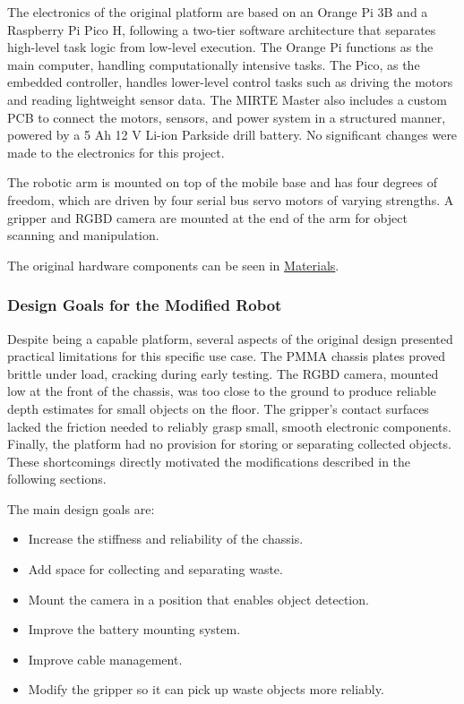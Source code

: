     The electronics of the original platform are based on an Orange Pi 3B and a Raspberry Pi Pico H, following a two-tier software architecture that separates high-level task logic from low-level execution. The Orange Pi functions as the main computer, handling computationally intensive tasks. The Pico, as the embedded controller, handles lower-level control tasks such as driving the motors and reading lightweight sensor data. The MIRTE Master also includes a custom PCB to connect the motors, sensors, and power system in a structured manner, powered by a 5 Ah 12 V Li-ion Parkside drill battery. No significant changes were made to the electronics for this project.

    The robotic arm is mounted on top of the mobile base and has four degrees of freedom, which are driven by four serial bus servo motors of varying strengths. A gripper and RGBD camera are mounted at the end of the arm for object scanning and manipulation.

    The original hardware components can be seen in \href{https://matt-rbt.github.io/Lab-Cleanup-Robot-using-the-Mirte-Master-Platform/materials/}{Materials}.

    \subsubsection{Design Goals for the Modified Robot}

    Despite being a capable platform, several aspects of the original design presented practical limitations for this specific use case. The PMMA chassis plates proved brittle under load, cracking during early testing. The RGBD camera, mounted low at the front of the chassis, was too close to the ground to produce reliable depth estimates for small objects on the floor. The gripper's contact surfaces lacked the friction needed to reliably grasp small, smooth electronic components. Finally, the platform had no provision for storing or separating collected objects. These shortcomings directly motivated the modifications described in the following sections.

    The main design goals are:
    \begin{itemize}
    \item Increase the stiffness and reliability of the chassis.
    \item Add space for collecting and separating waste.
    \item Mount the camera in a position that enables object detection.
    \item Improve the battery mounting system.
    \item Improve cable management.
    \item Modify the gripper so it can pick up waste objects more reliably.
    \end{itemize}

